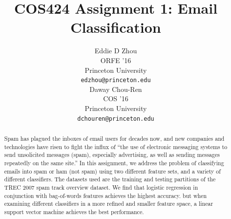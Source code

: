 \documentclass{article} %
\title{COS424 Assignment 1: Email Classification}
\author{
Eddie D Zhou\\
ORFE '16\\
Princeton University\\
\texttt{edzhou@princeton.edu} \\
\And
Daway Chou-Ren\\
COS '16\\
Princeton University\\
\texttt{dchouren@princeton.edu} \\
}
\begin{document}
\maketitle

\begin{abstract}
Spam has plagued the inboxes of email users for decades now, and new companies and technologies have risen to fight the influx of ``the use of electronic messaging systems to send unsolicited messages (spam), especially advertising, as well as sending messages repeatedly on the same site.''  In this assignment, we address the problem of classifying emails into spam or ham (not spam) using two different feature sets, and a variety of different classifiers.  The datasets used are the training and testing partitions of the TREC 2007 spam track overview dataset.  We find that logistic regression in conjunction with bag-of-words features achieves the highest accuracy. but when examining different classifiers in a more refined and smaller feature space, a linear support vector machine achieves the best performance.
\end{abstract}
\end{document}
